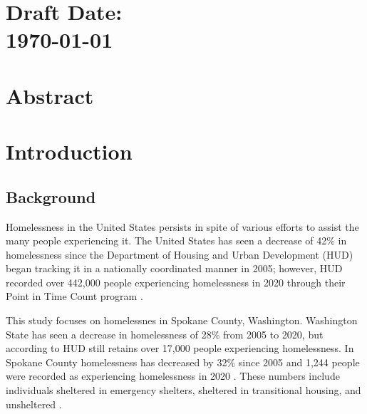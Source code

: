 \documentclass[12pt]{report}
\begin{document}
\chapter*{Draft Date: \\ \today \\ \currenttime}
\newpage

\chapter{Abstract}

\chapter{Introduction}
\section{Background}
Homelessness in the United States persists in spite of various efforts to assist the many people experiencing it. The United States has seen a decrease of 42\% in homelessness since the Department of Housing and Urban Development (HUD) began tracking it in a nationally coordinated manner in 2005; however, HUD recorded over 442,000 people experiencing homelessness in 2020 through their Point in Time Count program \cite{PITcount}. 

This study focuses on homelessnes in Spokane County, Washington. Washington State has seen a decrease in homelessness of 28\% from 2005 to 2020, but according to HUD still retains over 17,000 people experiencing homelessness. In Spokane County homelessness has decreased by 32\% since 2005 and 1,244 people were recorded as experiencing homelessness in 2020 \cite{PITcount}. These numbers include individuals sheltered in emergency shelters, sheltered in transitional housing, and unsheltered \cite{PITcount}.
\end{document}
